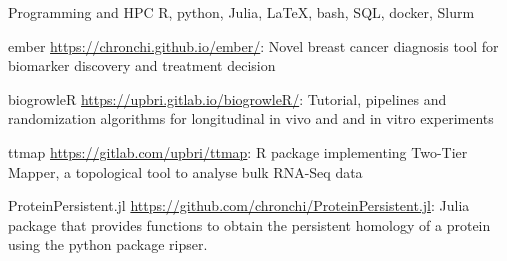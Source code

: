 

\begin{cvskills}

  \cvskill
    {Programming and HPC} %
    {R, python, Julia, LaTeX, bash, SQL, docker, Slurm} %

  \cvskill
    {ember} %
    {\url{https://chronchi.github.io/ember/}: Novel breast cancer
     diagnosis tool for biomarker discovery and treatment decision} %

  \cvskill
    {biogrowleR}
    {\url{https://upbri.gitlab.io/biogrowleR/}: Tutorial, pipelines
      and randomization algorithms for longitudinal in vivo and
      and in vitro experiments}

  \cvskill
    {ttmap}
    {\url{https://gitlab.com/upbri/ttmap}: R package implementing 
        Two-Tier Mapper, a topological tool to analyse bulk RNA-Seq data}

  \cvskill
    {ProteinPersistent.jl}
    {\url{https://github.com/chronchi/ProteinPersistent.jl}: Julia package
      that provides functions to obtain the persistent homology of a
      protein using the python package ripser.}

\end{cvskills}
